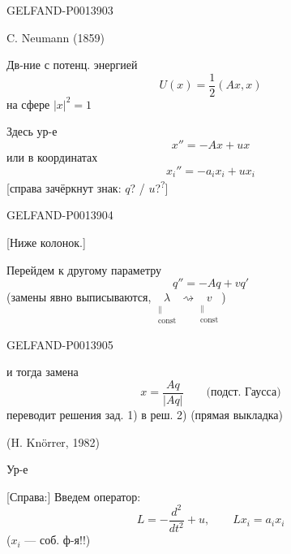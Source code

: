 \begin{GelfandAdjacentEvidence}{GELFAND-P001390}{3}

C. Neumann (1859)

Дв-ние с потенц. энергией
\[
U(x)=\frac12(Ax,x)
\]
на сфере \(\lvert x\rvert^2=1\)

Здесь ур-е
\begin{equation*}
x''=-Ax+ux
\tag{\(1'\)}
\end{equation*}
или в координатах
\begin{equation*}
x_i''=-a_i x_i+ux_i
\tag{\(1''\)}
\end{equation*}
[справа зачёркнут знак:
\(q\)? / \(u\)?\textsuperscript{?}]
\end{GelfandAdjacentEvidence}
\begin{GelfandAdjacentEvidence}{GELFAND-P001390}{4}


[Ниже колонок.]

Перейдем к другому параметру
\begin{equation*}
q''=-Aq+vq'
\tag{2}
\end{equation*}
(замены явно выписываются,
\(\underset{\substack{\parallel\\\mathrm{const}}}{\lambda}\rightsquigarrow
\underset{\substack{\parallel\\\mathrm{const}}}{v}\))
\end{GelfandAdjacentEvidence}
\begin{GelfandAdjacentEvidence}{GELFAND-P001390}{5}


и тогда замена
\begin{equation*}
x=\frac{Aq}{\lvert Aq\rvert}\qquad\text{(подст. Гаусса)}
\tag{3}
\end{equation*}
переводит решения зад. 1) в реш. 2) (прямая выкладка)
\end{GelfandAdjacentEvidence}


(H. Knörrer, 1982)

Ур-е

[Справа:] Введем оператор:
\begin{equation*}
L=-\frac{d^2}{dt^2}+u,\qquad Lx_i=a_i x_i
\tag{4}
\end{equation*}
(\(x_i\) --- соб. ф-я!!)



